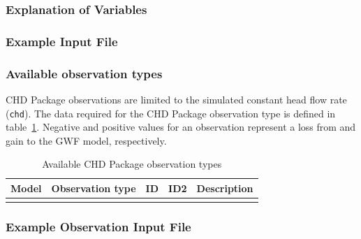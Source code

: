\vspace{5mm}
\subsubsection{Explanation of Variables}
\begin{description}

\end{description}

\vspace{5mm}
\subsubsection{Example Input File}


\vspace{5mm}
\subsubsection{Available observation types}
CHD Package observations are limited to the simulated constant head flow rate (\texttt{chd}). The data required for the CHD Package observation type is defined in table~\ref{table:gwf-chdgobstype}. Negative and positive values for an observation represent a loss from and gain to the GWF model, respectively.

\begin{longtable}{p{2cm} p{2.75cm} p{2cm} p{1.25cm} p{7cm}}
\caption{Available CHD Package observation types} \tabularnewline

\hline
\hline
\textbf{Model} & \textbf{Observation type} & \textbf{ID} & \textbf{ID2} & \textbf{Description} \\
\hline
\endhead

\hline
\endfoot


\label{table:gwf-chdgobstype}
\end{longtable}

\vspace{5mm}
\subsubsection{Example Observation Input File}



